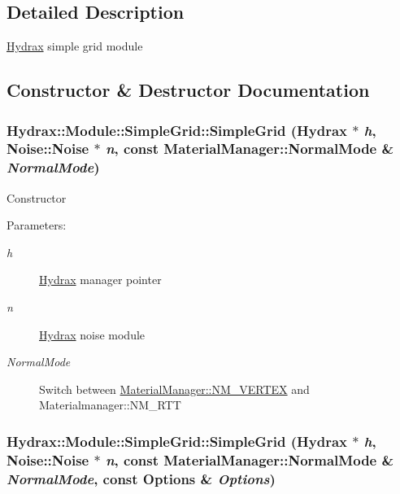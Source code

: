 \subsection{Detailed Description}
\hyperlink{class_hydrax_1_1_hydrax}{Hydrax} simple grid module 

\subsection{Constructor \& Destructor Documentation}
\hypertarget{class_hydrax_1_1_module_1_1_simple_grid_1576c59a302b3c24ac3d7dd8598e608c}{
\subsubsection[{SimpleGrid}]{\setlength{\rightskip}{0pt plus 5cm}Hydrax::Module::SimpleGrid::SimpleGrid ({\bf Hydrax} $\ast$ {\em h}, \/  {\bf Noise::Noise} $\ast$ {\em n}, \/  const {\bf MaterialManager::NormalMode} \& {\em NormalMode})}}
\label{class_hydrax_1_1_module_1_1_simple_grid_1576c59a302b3c24ac3d7dd8598e608c}


Constructor \begin{Desc}
\item[Parameters:]
\begin{description}
\item[{\em h}]\hyperlink{class_hydrax_1_1_hydrax}{Hydrax} manager pointer \item[{\em n}]\hyperlink{class_hydrax_1_1_hydrax}{Hydrax} noise module \item[{\em NormalMode}]Switch between \hyperlink{class_hydrax_1_1_material_manager_aa14689cd1c259f48954dfecda9b296ffe4d6257f673cf503a9905fb2576288f}{MaterialManager::NM\_\-VERTEX} and Materialmanager::NM\_\-RTT \end{description}
\end{Desc}
\hypertarget{class_hydrax_1_1_module_1_1_simple_grid_ae091cd103798dcc8f8b92af7dbfccef}{
\subsubsection[{SimpleGrid}]{\setlength{\rightskip}{0pt plus 5cm}Hydrax::Module::SimpleGrid::SimpleGrid ({\bf Hydrax} $\ast$ {\em h}, \/  {\bf Noise::Noise} $\ast$ {\em n}, \/  const {\bf MaterialManager::NormalMode} \& {\em NormalMode}, \/  const {\bf Options} \& {\em Options})}}
\label{class_hydrax_1_1_module_1_1_simple_grid_ae091cd103798dcc8f8b92af7dbfccef}


